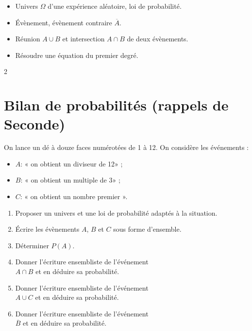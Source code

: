 \documentclass[10pt,a4paper]{article}
\begin{document}

\vspace{-0.3cm}

\begin{prerequis}
\begin{itemize}
    \item Univers \(\Omega\) d'une expérience aléatoire, loi de probabilité.
    \item Évènement, évènement contraire \(\overline{A}\).
    \item Réunion \(A\cup B\) et intersection \(A\cap B\) de deux évènements.
    \item Résoudre une équation du premier degré.
\end{itemize}
\end{prerequis}

\begin{multicols}{2}

\section{Bilan de probabilités (rappels de Seconde)}

\begin{exo}
On lance un dé à douze faces numérotées de 1 à 12.
On considère les événements :
\begin{itemize}
    \item $A$: « on obtient un diviseur de 12» ;
    \item $B$: « on obtient un multiple de 3» ;
    \item $C$: « on obtient un nombre premier ».
\end{itemize}

\begin{enumerate}
    \item Proposer un univers et une loi de probabilité adaptés à la situation.
    \item Écrire les évènements $A$, $B$ et $C$ sous forme d'ensemble.
    \item Déterminer $P(A)$.
    \item Donner l'écriture ensembliste de l'événement\\ $A \cap B$ et en déduire sa probabilité.
    \item Donner l'écriture ensembliste de l'événement\\ $A \cup C$ et en déduire sa probabilité.
    \item Donner l'écriture ensembliste de l'événement\\ $\overline{B} $ et en déduire sa probabilité.
\end{enumerate}
\end{exo}



\end{multicols}
\end{document}
